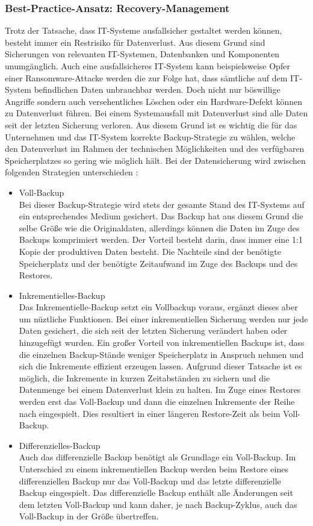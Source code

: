 \subsubsection{Best-Practice-Ansatz: Recovery-Management}
Trotz der Tatsache, dass IT-Systeme ausfallsicher gestaltet werden können, besteht immer ein Restrisiko für Datenverlust. Aus diesem Grund sind Sicherungen von relevanten IT-Systemen, Datenbanken und Komponenten unumgänglich. Auch eine ausfallsicheres IT-System kann beispielsweise Opfer einer Ransomware-Attacke werden die zur Folge hat, dass sämtliche auf dem IT-System befindlichen Daten unbrauchbar werden. Doch nicht nur böswillige Angriffe sondern auch versehentliches Löschen oder ein Hardware-Defekt können zu Datenverlust führen. Bei einem Systemausfall mit Datenverlust sind alle Daten seit der letzten Sicherung verloren. Aus diesem Grund ist es wichtig die für das Unternehmen und das IT-System korrekte Backup-Strategie zu wählen, welche den Datenverlust im Rahmen der technischen Möglichkeiten und des verfügbaren Speicherplatzes so gering wie möglich hält.
\bigbreak
Bei der Datensicherung wird zwischen folgenden Strategien unterschieden \autocite{BeardBradley2018BBaR}:
\begin{itemize}
    \item Voll-Backup\\
    Bei dieser Backup-Strategie wird stets der gesamte Stand des IT-Systems auf ein entsprechendes Medium gesichert. Das Backup hat aus diesem Grund die selbe Größe wie die Originaldaten, allerdings können die Daten im Zuge des Backups komprimiert werden. Der Vorteil besteht darin, dass immer eine 1:1 Kopie der produktiven Daten besteht. Die Nachteile sind der benötigte Speicherplatz und der benötigte Zeitaufwand im Zuge des Backups und des Restores. 
    \item Inkrementielles-Backup\\
    Das Inkrementielle-Backup setzt ein Vollbackup voraus, ergänzt dieses aber um nüztliche Funktionen. Bei einer inkrementiellen Sicherung werden nur jede Daten gesichert, die sich seit der letzten Sicherung verändert haben oder hinzugefügt wurden. Ein großer Vorteil von inkrementiellen Backups ist, dass die einzelnen Backup-Stände weniger Speicherplatz in Anspruch nehmen und sich die Inkremente effizient erzeugen lassen. Aufgrund dieser Tatsache ist es möglich, die Inkremente in kurzen Zeitabständen zu sichern und die Datenmenge bei einem Datenverlust klein zu halten. Im Zuge eines Restores werden erst das Voll-Backup und dann die einzelnen Inkremente der Reihe nach eingespielt. Dies resultiert in einer längeren Restore-Zeit als beim Voll-Backup.
    \item Differenzielles-Backup\\
    Auch das differenzielle Backup benötigt als Grundlage ein Voll-Backup. Im Unterschied zu einem inkrementiellen Backup werden beim Restore eines differenziellen Backup nur das Voll-Backup und das letzte differenzielle Backup eingespielt. Das differenzielle Backup enthält alle Änderungen seit dem letzten Voll-Backup und kann daher, je nach Backup-Zyklus, auch das Voll-Backup in der Größe übertreffen.
\end{itemize}

